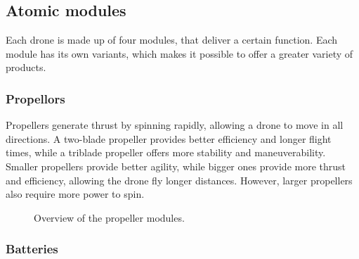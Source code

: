 \documentclass[sigconf,review]{acmart}
\begin{document}
\subsection{Atomic modules}
\label{sec:atomic-modules}

Each drone is made up of four modules, that deliver a certain function. 
Each module has its own variants, which makes it possible to offer a greater variety of products. 


\subsubsection{Propellors}
\label{sec:propellors}

Propellers generate thrust by spinning rapidly, allowing a drone to move in all directions. 
A two-blade propeller provides better efficiency and longer flight times, while a triblade propeller offers more stability and maneuverability. 
Smaller propellers provide better agility, while bigger ones provide more thrust and efficiency, allowing the drone fly longer distances. 
However, larger propellers also require more power to spin.

\begin{figure}[htbp]
    \hfill
    \hfill
    \caption{Overview of the propeller modules.}
    \label{fig:propeller}
\end{figure}

\subsubsection{Batteries}
\label{sec:batteries}
\end{document}
